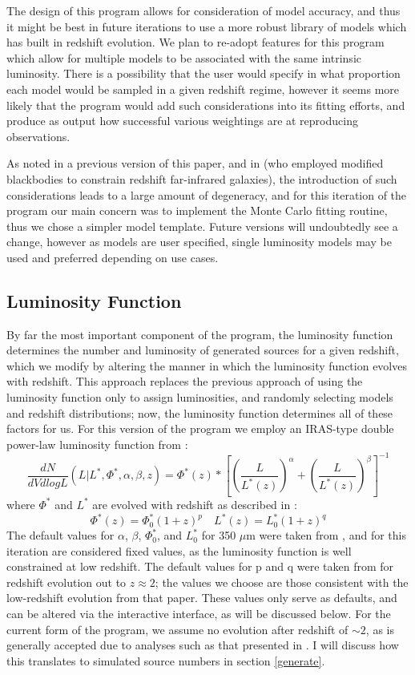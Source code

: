 \documentclass[twocolumn,letterpaper,10pt]{article}
\begin{document}
The design of this program allows for consideration of model accuracy, and thus it might be best in future iterations to use a more robust library of models which has built in redshift evolution. We plan to re-adopt features for this program which allow for multiple models to be associated with the same intrinsic luminosity. There is a possibility that the user would specify in what proportion each model would be sampled in a given redshift regime, however it seems more likely that the program would add such considerations into its fitting efforts, and produce as output how successful various weightings are at reproducing observations. 

As noted in a previous version of this paper, and in \citet {wiklind03} (who employed modified blackbodies to constrain redshift far-infrared galaxies), the introduction of such considerations leads to a large amount of degeneracy, and for this iteration of the program our main concern was to implement the Monte Carlo fitting routine, thus we chose a simpler model template. Future versions will undoubtedly see a change, however as models are user specified, single luminosity models may be used and preferred depending on use cases.

\subsection{Luminosity Function}

By far the most important component of the program, the luminosity function determines the number and luminosity of generated sources for a given redshift, which we modify by altering the manner in which the luminosity function evolves with redshift. This approach replaces the previous approach of using the luminosity function only to assign luminosities, and randomly selecting models and redshift distributions; now, the luminosity function determines all of these factors for us. For this version of the program we employ an IRAS-type double power-law luminosity function from \citet{negrello13}:
$$
\frac{dN}{dV dlogL}(L|L^*,\Phi^*,\alpha,\beta,z) = \Phi^*(z)*\left[{\left(\frac{L}{L^*(z)}\right)}^{\alpha}+\left(\frac{L}{L^*(z)}\right)^{\beta}\right]^{-1}
$$
where $\Phi^*$ and $L^*$ are evolved with redshift as described in \citet{Caputi07}:
$$
\Phi^*(z) = \Phi^*_0(1+z)^p \quad
L^*(z) = L^*_0(1+z)^q
$$
The default values for $\alpha$, $\beta$, $\Phi^*_0$, and $L^*_0$ for 350 $\mu$m were taken from \citet{negrello13}, and for this iteration are considered fixed values, as the luminosity function is well constrained at low redshift. The default values for p and q were taken from \citet{Caputi07} for redshift evolution out to $z\approx2$; the values we choose are those consistent with the low-redshift evolution from that paper. These values only serve as defaults, and can be altered via the interactive interface, as will be discussed below. For the current form of the program, we assume no evolution after redshift of $\sim2$, as is generally accepted due to analyses such as that presented in \citet{marsden11}. I will discuss how this translates to simulated source numbers in section \ref{generate}.
\end{document}
